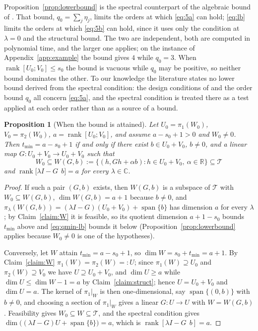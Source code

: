 ﻿\documentclass[journal]{IEEEtran}
\theoremstyle{plainn}
\newtheorem{prop}[thm]{Proposition}
\theoremstyle{remark}
\begin{document}
Proposition~\ref{prop:lowerbound} is the spectral counterpart of the algebraic bound of
\cite{fer26a,fer26b}. That bound, $q_0=\sum_j\eta_j$, limits the orders at which \eqref{eq:5a} can
hold; \eqref{eq:lb} limits the orders at which \eqref{eq:5b} can hold, since it uses only the condition
at $\lambda=0$ and the structural bound. The two are independent, both are computed in polynomial time,
and the larger one applies; on the instance of Appendix~\ref{app:example} the bound gives $4$ while
$q_0=3$. When $\operatorname{rank}[U_0;V_0]\le s_0$ the bound is vacuous while $q_0$ may be positive, so
neither bound dominates the other. To our knowledge the literature states no lower bound derived from the spectral condition: the
design conditions of \cite{fer10,dar25,fer26a,fer26b} and the order bound $q_0$ all concern
\eqref{eq:5a}, and the spectral condition is treated there as a test applied at each order rather than
as a source of a bound.

\begin{prop}[When the bound is attained]\label{prop:tight}
Let $U_0=\pi_1(W_0)$, $V_0=\pi_2(W_0)$, $a=\operatorname{rank}[U_0;V_0]$, and assume
$a-s_0+1>0$ and $W_0\neq0$. Then $t_{\min}=a-s_0+1$ if and only if there exist $b\in U_0+V_0$,
$b\neq0$, and a linear map
$G:U_0+V_0\to U_0+V_0$ such that
\begin{equation*}
W_0\subseteq W(G,b):=\bigl\{(h,Gh+\alpha b):h\in U_0+V_0,\ \alpha\in\mathbb R\bigr\}\subseteq\mathcal T
\end{equation*}
and $\operatorname{rank}\bigl[\lambda I-G\ \ b\bigr]=a$ for every $\lambda\in\mathbb C$.
\end{prop}

\begin{proof}
If such a pair $(G,b)$ exists, then $W(G,b)$ is a subspace of $\mathcal T$ with $W_0\subseteq W(G,b)$,
$\dim W(G,b)=a+1$ because $b\neq0$, and $\pi_\lambda(W(G,b))=(\lambda I-G)(U_0+V_0)+\operatorname{span}\{b\}$
has dimension $a$ for every $\lambda$; by Claim~\ref{claim:W} it is feasible, so its quotient
dimension $a+1-s_0$ bounds $t_{\min}$ above and \eqref{eq:qmin-lb} bounds it below
(Proposition~\ref{prop:lowerbound} applies because $W_0\neq0$ is one of the hypotheses).

Conversely, let $W$ attain $t_{\min}=a-s_0+1$, so $\dim W=s_0+t_{\min}=a+1$. By
Claim~\ref{claim:W} $\pi_1(W)=\pi_2(W)=:U$; since $\pi_1(W)\supseteq U_0$ and
$\pi_2(W)\supseteq V_0$ we have $U\supseteq U_0+V_0$, and $\dim U\ge a$ while
$\dim U\le\dim W-1=a$ by Claim~\ref{claim:struct}; hence $U=U_0+V_0$ and $\dim U=a$. The kernel of
$\pi_1|_W$ is then one-dimensional, say $\operatorname{span}\{(0,b)\}$ with $b\neq0$, and choosing a
section of $\pi_1|_W$ gives a linear $G:U\to U$ with $W=W(G,b)$. Feasibility gives
$W_0\subseteq W\subseteq\mathcal T$, and the spectral condition gives
$\dim\bigl((\lambda I-G)U+\operatorname{span}\{b\}\bigr)=a$, which is
$\operatorname{rank}[\lambda I-G\ \ b]=a$.
\end{proof}
\end{document}
